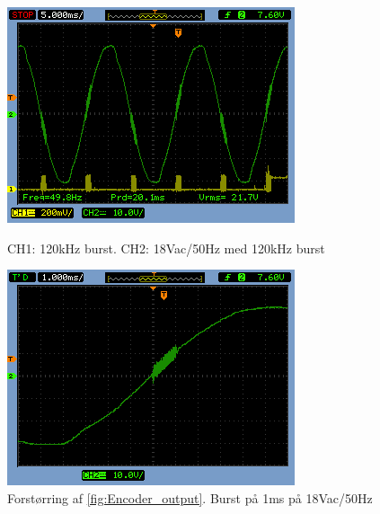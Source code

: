 \begin{figure}[H]
  \begin{minipage}{0.45\textwidth}
    \centering
      \includegraphics[width=\textwidth]{billeder/HWTest/Encoder/Encoder_50Hz_burst_120kHz}
		\caption{CH1: 120kHz burst. CH2: 18Vac/50Hz med 120kHz burst}
    \label{fig:Encoder_output}
  \end{minipage}
  \hspace{0.1\textwidth}
  \begin{minipage}{0.45\textwidth}
    \centering
      \includegraphics[width=\textwidth]{billeder/HWTest/Encoder/Encoder_burst_1ms}
		\caption{Forstørring af \ref{fig:Encoder_output}. Burst på 1ms på 18Vac/50Hz}
    \label{fig:Encoder_burst_1ms}
  \end{minipage}
\end{figure}

